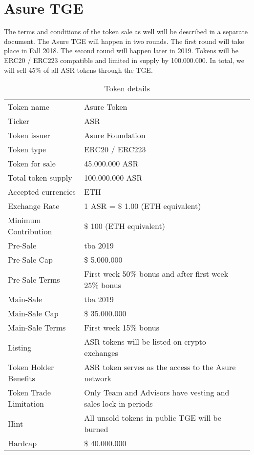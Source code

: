 \section{Asure TGE}

The terms and conditions of the token sale as well will be described in a separate document.
The Asure TGE will happen in two rounds. The first round will take place in Fall 2018. The second round will happen later in 2019. Tokens will be ERC20 / ERC223 compatible and limited in supply by 100.000.000. In total, we will sell 45\% of all ASR tokens through the TGE. 

\begin{table}[H]
\begin{tabular}{lp{}l}
  Token name & Asure Token \\  
  Ticker & ASR\\
  Token issuer & Asure Foundation\\
  Token type & ERC20 / ERC223 \\
  Token for sale & 45.000.000 ASR \\
  Total token supply & 100.000.000 ASR \\
  Accepted currencies & ETH \\
  Exchange Rate & 1 ASR = \$ 1.00 (ETH equivalent) \\
  Minimum Contribution & \$ 100 (ETH equivalent) \\\hline  
  
  Pre-Sale & tba 2019 \\
  Pre-Sale Cap & \$ 5.000.000 \\
  Pre-Sale Terms & First week 50\% bonus and after first week 25\% bonus \\\hline
  Main-Sale & tba 2019 \\  
  Main-Sale Cap & \$ 35.000.000 \\
  Main-Sale Terms & First week 15\% bonus \\\hline

  Listing & ASR tokens will be listed on crypto exchanges \\
  Token Holder Benefits & ASR token serves as the access to the Asure network \\
  Token Trade Limitation & Only Team and Advisors have vesting and sales lock-in periods \\
  Hint & All unsold tokens in public TGE  will be burned \\\hline  
  
  Hardcap & \$ 40.000.000
  
\end{tabular}
\caption{\label{tab:table-name}Token details}
\end{table}


